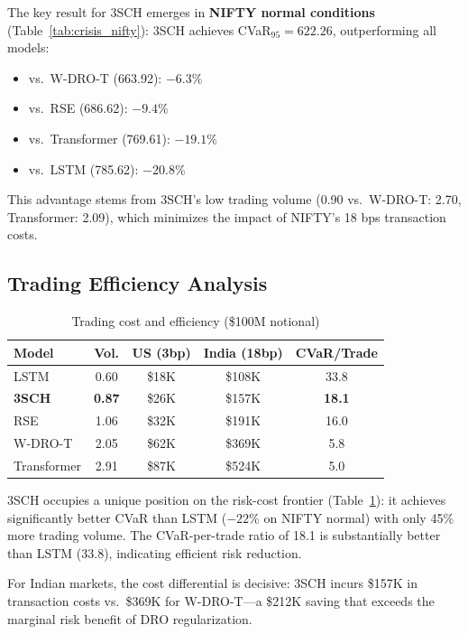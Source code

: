 \documentclass[11pt]{article}
\begin{document}
The key result for 3SCH emerges in \textbf{NIFTY normal conditions} (Table~\ref{tab:crisis_nifty}): 3SCH achieves CVaR$_{95} = 622.26$, outperforming all models:
\begin{itemize}[noitemsep]
    \item vs.\ W-DRO-T (663.92): $-6.3\%$
    \item vs.\ RSE (686.62): $-9.4\%$
    \item vs.\ Transformer (769.61): $-19.1\%$
    \item vs.\ LSTM (785.62): $-20.8\%$
\end{itemize}

This advantage stems from 3SCH's low trading volume (0.90 vs.\ W-DRO-T: 2.70, Transformer: 2.09), which minimizes the impact of NIFTY's 18 bps transaction costs.

\subsection{Trading Efficiency Analysis}

\begin{table}[t]
\centering
\caption{Trading cost and efficiency (\$100M notional)}
\label{tab:trading}
\small
\begin{tabular}{lcccc}
\toprule
\textbf{Model} & \textbf{Vol.} & \textbf{US (3bp)} & \textbf{India (18bp)} & \textbf{CVaR/Trade} \\
\midrule
LSTM & 0.60 & \$18K & \$108K & 33.8 \\
\textbf{3SCH} & \textbf{0.87} & \$26K & \$157K & \textbf{18.1} \\
RSE & 1.06 & \$32K & \$191K & 16.0 \\
W-DRO-T & 2.05 & \$62K & \$369K & 5.8 \\
Transformer & 2.91 & \$87K & \$524K & 5.0 \\
\bottomrule
\end{tabular}
\end{table}

3SCH occupies a unique position on the risk-cost frontier (Table~\ref{tab:trading}): it achieves significantly better CVaR than LSTM ($-22\%$ on NIFTY normal) with only 45\% more trading volume. The CVaR-per-trade ratio of 18.1 is substantially better than LSTM (33.8), indicating efficient risk reduction.

For Indian markets, the cost differential is decisive: 3SCH incurs \$157K in transaction costs vs.\ \$369K for W-DRO-T---a \$212K saving that exceeds the marginal risk benefit of DRO regularization.
\end{document}
